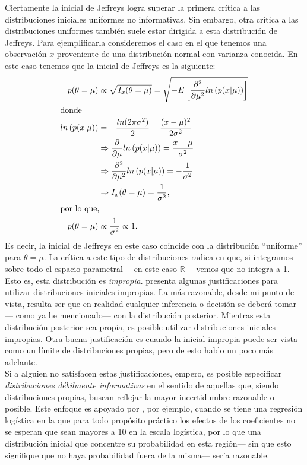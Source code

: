 Ciertamente la inicial de Jeffreys logra superar la primera crítica a las distribuciones iniciales uniformes no informativas. Sin embargo, otra crítica a las distribuciones uniformes también suele estar dirigida a esta distribución de Jeffreys. Para ejemplificarla consideremos el caso en el que tenemos una observación $x$ proveniente de una distribución normal con varianza conocida. En este caso tenemos que la inicial de Jeffreys es la siguiente: 
\begin{align*}
p(\theta = \mu) &\propto \sqrt{I_x(\theta = \mu)} = \sqrt{-E\left[\dfrac{\partial^2}{\partial\mu^2} ln\left(p(x|\mu)\right) \right]}\\ \intertext{donde}
ln\left(p(x|\mu)\right) &= -\dfrac{ln(2\pi\sigma^2)}{2}-\dfrac{(x-\mu)^2}{2\sigma^2}\\ 
&\Rightarrow \dfrac{\partial}{\partial\mu} ln\left(p(x|\mu)\right) = \dfrac{x-\mu}{\sigma^2}\\
&\Rightarrow \dfrac{\partial^2}{\partial\mu^2} ln\left(p(x|\mu)\right) = -\dfrac{1}{\sigma^2}\\
&\Rightarrow I_x(\theta = \mu) = \dfrac{1}{\sigma^2},\\
\intertext{por lo que,}
p(\theta = \mu) &\propto \dfrac{1}{\sigma^2} \propto 1.
\end{align*}
Es decir, la inicial de Jeffreys en este caso coincide con la distribución ``uniforme'' para $\theta = \mu$. La crítica a este tipo de distribuciones radica en que, si integramos sobre todo el espacio parametral--- en este caso $\mathbb{R}$--- vemos que no integra a 1. Esto es, esta distribución es \textit{impropia}. \textcite[27-28]{Robert07} presenta algunas justificaciones para utilizar distribuciones iniciales impropias. La más razonable, desde mi punto de vista, resulta ser que en realidad cualquier inferencia o decisión se deberá tomar--- como ya he mencionado--- con la distribución posterior. Mientras esta distribución posterior sea propia, es posible utilizar distribuciones iniciales impropias. Otra buena justificación es cuando la inicial impropia puede ser vista como un límite de distribuciones propias, pero de esto hablo un poco más adelante.\\ 

Si a alguien no satisfacen estas justificaciones, empero, es posible especificar \textit{distribuciones débilmente informativas} en el sentido de aquellas que, siendo distribuciones propias, buscan reflejar la mayor incertidumbre razonable o posible. Este enfoque es apoyado por \textcite[55,415-416]{Gelman13}, por ejemplo, cuando se tiene una regresión logística en la que para todo propósito práctico los efectos de los coeficientes no se esperan que sean mayores a 10 en la escala logística, por lo que una distribución inicial que concentre su probabilidad en esta región--- sin que esto signifique que no haya probabilidad fuera de la misma--- sería razonable. 

